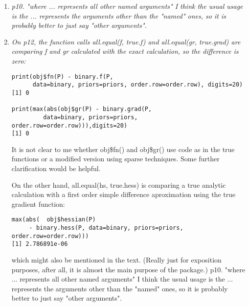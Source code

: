 \documentclass{article}
\newenvironment{revQuote}{\itshape}{\vspace{\baselineskip}}
\newenvironment{response}{\normalfont}{\vspace{\baselineskip}}
\begin{document}
\begin{enumerate}
\begin{response}
  
\end{response}


\item \begin{revQuote}
p10. "where ... represents all other named arguments"
   I think the usual usage is the ... represents the arguments other than
the "named" ones, so it is probably better to just say "other arguments".
  \end{revQuote}

\begin{response}
  
\end{response}


\item \begin{revQuote}
On p12, the function calls all.equal(f, true.f) and all.equal(gr,
true.grad) are comparing f and gr calculated with the exact calculation, so
the difference is zero:

\begin{verbatim}
print(obj$fn(P) - binary.f(P, 
      data=binary, priors=priors, order.row=order.row), digits=20)
[1] 0

print(max(abs(obj$gr(P) - binary.grad(P, 
         data=binary, priors=priors,
order.row=order.row))),digits=20)
[1] 0

\end{verbatim}

It is not clear to me whether obj\$fn() and obj\$gr() use code as in the true
functions or a modified version using sparse techniques. Some further
clarification would be helpful.

On the other hand, all.equal(hs, true.hess) is comparing a true analytic
calculation with a first order simple difference aproximation using the true
gradient function:
\begin{verbatim}
max(abs(  obj$hessian(P)
     - binary.hess(P, data=binary, priors=priors, order.row=order.row)))
[1] 2.786891e-06
\end{verbatim}

which might also be mentioned in the text. (Really just for exposition
purposes, after all, it is almost the main purpose of the package.)
p10. "where ... represents all other named arguments"
   I think the usual usage is the ... represents the arguments other than
the "named" ones, so it is probably better to just say "other arguments".
  \end{revQuote}


\end{enumerate}
\end{document}
